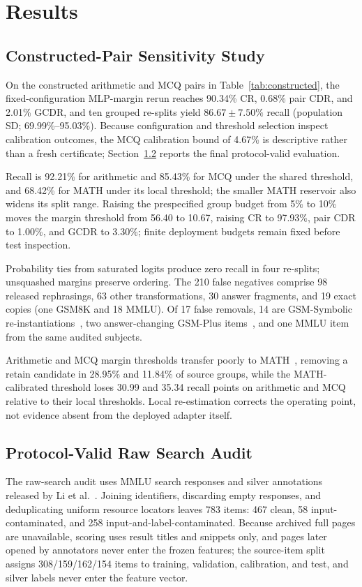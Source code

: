 \documentclass[conference]{IEEEtran}
\begin{document}
\section{Results}
\label{sec:results}
\subsection{Constructed-Pair Sensitivity Study}
On the constructed arithmetic and MCQ pairs in Table~\ref{tab:constructed}, the fixed-configuration MLP-margin rerun reaches 90.34\% CR, 0.68\% pair CDR, and 2.01\% GCDR, and ten grouped re-splits yield $86.67\pm7.50\%$ recall (population SD; 69.99\%--95.03\%). Because configuration and threshold selection inspect calibration outcomes, the MCQ calibration bound of 4.67\% is descriptive rather than a fresh certificate; Section~\ref{sec:raw} reports the final protocol-valid evaluation.

Recall is 92.21\% for arithmetic and 85.43\% for MCQ under the shared threshold, and 68.42\% for MATH under its local threshold; the smaller MATH reservoir also widens its split range. Raising the prespecified group budget from 5\% to 10\% moves the margin threshold from 56.40 to 10.67, raising CR to 97.93\%, pair CDR to 1.00\%, and GCDR to 3.30\%; finite deployment budgets remain fixed before test inspection.

Probability ties from saturated logits produce zero recall in four re-splits; unsquashed margins preserve ordering. The 210 false negatives comprise 98 released rephrasings, 63 other transformations, 30 answer fragments, and 19 exact copies (one GSM8K and 18 MMLU). Of 17 false removals, 14 are GSM-Symbolic re-instantiations~\cite{mirzadeh2024}, two answer-changing GSM-Plus items~\cite{li2024gsmplus}, and one MMLU item from the same audited subjects.

Arithmetic and MCQ margin thresholds transfer poorly to MATH~\cite{huang2025}, removing a retain candidate in 28.95\% and 11.84\% of source groups, while the MATH-calibrated threshold loses 30.99 and 35.34 recall points on arithmetic and MCQ relative to their local thresholds. Local re-estimation corrects the operating point, not evidence absent from the deployed adapter itself.

\subsection{Protocol-Valid Raw Search Audit}
\label{sec:raw}
The raw-search audit uses MMLU search responses and silver annotations released by Li et al.~\cite{li2024}. Joining identifiers, discarding empty responses, and deduplicating uniform resource locators leaves 783 items: 467 clean, 58 input-contaminated, and 258 input-and-label-contaminated. Because archived full pages are unavailable, scoring uses result titles and snippets only, and pages later opened by annotators never enter the frozen features; the source-item split assigns 308/159/162/154 items to training, validation, calibration, and test, and silver labels never enter the feature vector.
\end{document}
